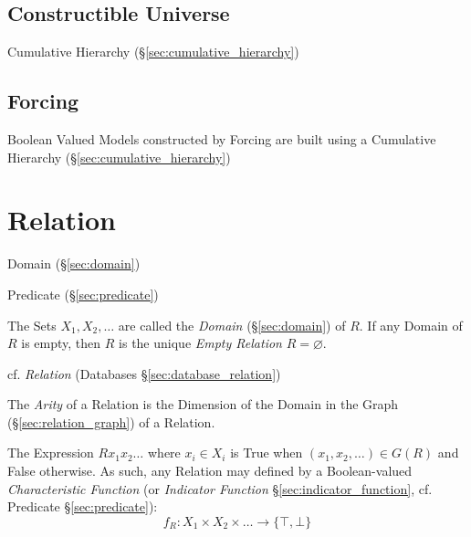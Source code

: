 


\subsection{Constructible Universe}\label{sec:constrictible_universe}

Cumulative Hierarchy (\S\ref{sec:cumulative_hierarchy})



\subsection{Forcing}\label{sec:forcing}

Boolean Valued Models constructed by Forcing are built using a
Cumulative Hierarchy (\S\ref{sec:cumulative_hierarchy})



\section{Relation}\label{sec:set_relation}

Domain (\S\ref{sec:domain})

Predicate (\S\ref{sec:predicate})

The Sets $X_1, X_2, \ldots$ are called the \emph{Domain}
(\S\ref{sec:domain}) of $R$. If any Domain of $R$ is empty, then $R$
is the unique \emph{Empty Relation} $R = \varnothing$.

\fist cf. \emph{Relation} (Databases \S\ref{sec:database_relation})

The \emph{Arity} of a Relation is the Dimension of the Domain in the
Graph (\S\ref{sec:relation_graph}) of a Relation. %

The Expression $R x_1 x_2 \ldots$ where $x_i \in X_i$ is True when
$(x_1, x_2, \ldots) \in G(R)$ and False otherwise. As such, any
Relation may defined by a Boolean-valued \emph{Characteristic
  Function} (or \emph{Indicator Function}
\S\ref{sec:indicator_function}, cf. Predicate \S\ref{sec:predicate}):
\[
  f_R : X_1 \times X_2 \times \ldots \to \{\top,\bot\}
\]

